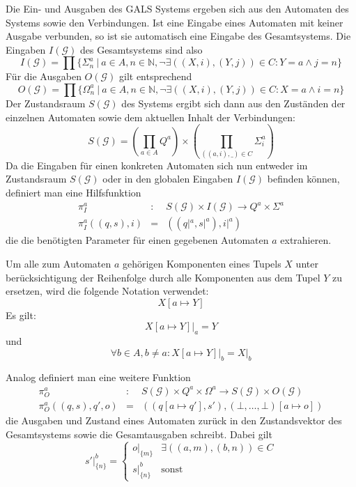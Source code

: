 Die Ein- und Ausgaben des GALS Systems ergeben sich aus den Automaten des Systems sowie den Verbindungen.
Ist eine Eingabe eines Automaten mit keiner Ausgabe verbunden, so ist sie automatisch eine Eingabe des Gesamtsystems.
Die Eingaben $I(\mathcal{G})$ des Gesamtsystems sind also
\[ I(\mathcal{G}) = \prod \{ \Sigma^a_n\ |\ a\in A, n\in \mathbb{N}, \lnot\exists ((X,i),(Y,j))\in C: Y=a\land j=n \} \]
Für die Ausgaben $O(\mathcal{G})$ gilt entsprechend
\[ O(\mathcal{G}) = \prod \{ \Omega^a_n\ |\ a\in A, n\in \mathbb{N}, \lnot\exists ((X,i),(Y,j))\in C: X=a\land i=n \} \]
Der Zustandsraum $S(\mathcal{G})$ des Systems ergibt sich dann aus den Zuständen der einzelnen Automaten sowie dem aktuellen Inhalt der Verbindungen:
\[ S(\mathcal{G}) = \left(\prod_{a\in A} Q^a\right)\times\left(\prod_{((a,i),\_)\in C} \Sigma^a_i\right) \]
Da die Eingaben für einen konkreten Automaten sich nun entweder im Zustandsraum $S(\mathcal{G})$ oder in den globalen Eingaben $I(\mathcal{G})$ befinden können, definiert man eine Hilfsfunktion 
\begin{eqnarray*}
  \pi_I^a &:& S(\mathcal{G})\times I(\mathcal{G})\rightarrow Q^a\times\Sigma^a\\
  \pi_I^a((q,s),i) &=& ((q|^a,s|^a),i|^a)
\end{eqnarray*}
die die benötigten Parameter für einen gegebenen Automaten $a$ extrahieren.
\begin{notation}
  Um alle zum Automaten $a$ gehörigen Komponenten eines Tupels $X$ unter berücksichtigung der Reihenfolge durch alle Komponenten aus dem Tupel $Y$ zu ersetzen, wird die folgende Notation verwendet:
  \[ X[a\mapsto Y] \]
  Es gilt:
  \[ \left.X[a\mapsto Y]\right|_a = Y \]
  und
  \[ \forall b\in A,b\neq a: \left.X[a\mapsto Y]\right|_b = X|_b \]
\end{notation}
Analog definiert man eine weitere Funktion 
\begin{eqnarray*}
  \pi_O^a &:& S(\mathcal{G})\times Q^a\times\Omega^a\rightarrow S(\mathcal{G})\times O(\mathcal{G})\\
  \pi_O^a ((q,s),q',o) &=& ((q[a\mapsto q'],s'),(\bot,\dots,\bot)[a\mapsto o])
\end{eqnarray*}
die Ausgaben und Zustand eines Automaten zurück in den Zustandsvektor des Gesamtsystems sowie die Gesamtausgaben schreibt.
Dabei gilt
\[ s'|_{\{n\}}^b = \left\{\begin{array}{lr}
    o|_{\{m\}} & \exists ((a,m),(b,n))\in C\\[10pt]
    s|_{\{n\}}^b & \textrm{sonst}
  \end{array}\right. \]
